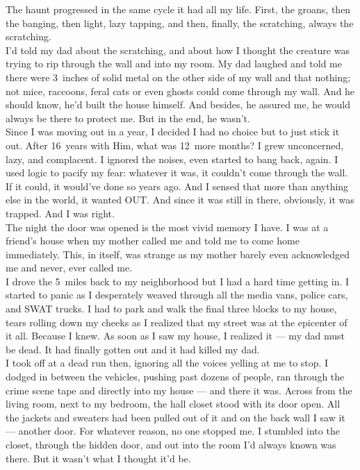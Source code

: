 \documentclass[a5paper]{scrartcl}
\begin{document}
The haunt progressed in the same cycle it had all my life. First, the groans, then the banging, then light, lazy tapping, and then, finally, the scratching, always the scratching.     \\


I'd told my dad about the scratching, and about how I thought the creature was trying to rip through the wall and into my room. My dad laughed and told me there were 3~inches of solid metal on the other side of my wall and that nothing; not mice, raccoons, feral cats or even ghosts could come through my wall. And he should know, he'd built the house himself. And besides, he assured me, he would always be there to protect me. But in the end, he wasn't.\\


Since I was moving out in a year, I decided I had no choice but to just stick it out. After 16~years with Him, what was 12~more months? I grew unconcerned, lazy, and complacent. I ignored the noises, even started to bang back, again. I used logic to pacify my fear: whatever it was, it couldn't come through the wall. If it could, it would've done so years ago. And I sensed that more than anything else in the world, it wanted OUT. And since it was still in there, obviously, it was trapped. And I was right.\\


The night the door was opened is the most vivid memory I have. I was at a friend's house when my mother called me and told me to come home immediately. This, in itself, was strange as my mother barely even acknowledged me and never, ever called me.\\


I drove the 5~miles back to my neighborhood but I had a hard time getting in. I started to panic as I desperately weaved through all the media vans, police cars, and SWAT trucks. I had to park and walk the final three blocks to my house, tears rolling down my cheeks as I realized that my street was at the epicenter of it all. Because I knew. As soon as I saw my house, I realized it --- my dad must be dead. It had finally gotten out and it had killed my dad.\\


I took off at a dead run then, ignoring all the voices yelling at me to stop. I dodged in between the vehicles, pushing past dozens of people, ran through the crime scene tape and directly into my house --- and there it was. Across from the living room, next to my bedroom, the hall closet stood with its door open. All the jackets and sweaters had been pulled out of it and on the back wall I saw it --- another door.
For whatever reason, no one stopped me. I stumbled into the closet, through the hidden door, and out into the room I'd always known was there. But it wasn't what I thought it'd be.\\
\end{document}
